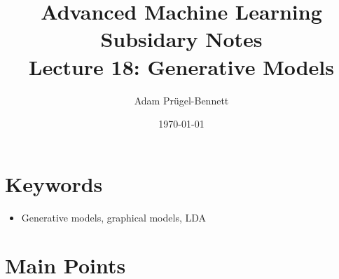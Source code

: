 \documentclass[11pt]{article}
\author{Adam Prügel-Bennett}
\date{\today}
\title{Advanced Machine Learning Subsidary Notes\\\medskip
\large Lecture 18: Generative Models}
\begin{document}
\maketitle



\section{Keywords}
\label{sec:orgc04738f}
\begin{itemize}
\item Generative models, graphical models, LDA
\end{itemize}

\section{Main Points}
\label{sec:org4ac7d34}
\end{document}
